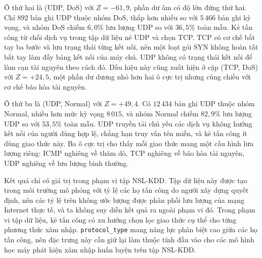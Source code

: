 Ô thứ hai là (UDP, DoS) với $Z = -61{,}9$, phần dư âm có độ lớn đứng thứ hai. Chỉ $892$ bản ghi UDP thuộc nhóm DoS, thấp hơn nhiều so với $5\,466$ bản ghi kỳ vọng, và nhóm DoS chiếm $6{,}0\%$ lưu lượng UDP so với $36{,}5\%$ toàn mẫu. Kẻ tấn công từ chối dịch vụ trong tập dữ liệu né UDP và chọn TCP. TCP có cơ chế bắt tay ba bước và lưu trạng thái từng kết nối, nên một loạt gói SYN không hoàn tất bắt tay làm đầy bảng kết nối của máy chủ. UDP không có trạng thái kết nối để làm cạn tài nguyên theo cách đó. Dấu hiệu này cũng xuất hiện ở cặp (TCP, DoS) với $Z = +24{,}5$, một phần dư dương nhỏ hơn hai ô cực trị nhưng cùng chiều với cơ chế bão hòa tài nguyên.

Ô thứ ba là (UDP, Normal) với $Z = +49{,}4$. Có $12\,434$ bản ghi UDP thuộc nhóm Normal, nhiều hơn mức kỳ vọng $8\,015$, và nhóm Normal chiếm $82{,}9\%$ lưu lượng UDP so với $53{,}5\%$ toàn mẫu. UDP truyền tải chủ yếu các dịch vụ không hướng kết nối của người dùng hợp lệ, chẳng hạn truy vấn tên miền, và kẻ tấn công ít dùng giao thức này. Ba ô cực trị cho thấy mỗi giao thức mang một cấu hình lưu lượng riêng: ICMP nghiêng về thăm dò, TCP nghiêng về bão hòa tài nguyên, UDP nghiêng về lưu lượng bình thường.

Kết quả chỉ có giá trị trong phạm vi tập NSL-KDD. Tập dữ liệu này được tạo trong môi trường mô phỏng với tỷ lệ các họ tấn công do người xây dựng quyết định, nên các tỷ lệ trên không ước lượng được phân phối lưu lượng của mạng Internet thực tế, và ta không suy diễn kết quả ra ngoài phạm vi đó. Trong phạm vi tập dữ liệu, kẻ tấn công có xu hướng chọn lọc giao thức cụ thể cho từng phương thức xâm nhập. \texttt{protocol\_type} mang năng lực phân biệt cao giữa các họ tấn công, nên đặc trưng này cần giữ lại làm thuộc tính đầu vào cho các mô hình học máy phát hiện xâm nhập huấn luyện trên tập NSL-KDD.
